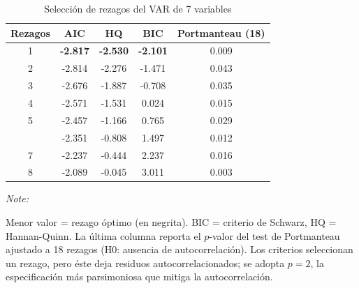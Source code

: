 \begin{table}[!h]
\centering
\caption{\label{tab:varselect7}Selección de rezagos del VAR de 7 variables}
\centering
\begin{threeparttable}
\begin{tabular}[t]{ccccc}
\toprule
Rezagos & AIC & HQ & BIC & Portmanteau (18)\\
\midrule
1 & \textbf{-2.817} & \textbf{-2.530} & \textbf{-2.101} & 0.009\\
2 & -2.814 & -2.276 & -1.471 & 0.043\\
3 & -2.676 & -1.887 & -0.708 & 0.035\\
4 & -2.571 & -1.531 & 0.024 & 0.015\\
5 & -2.457 & -1.166 & 0.765 & 0.029\\
\addlinespace
6 & -2.351 & -0.808 & 1.497 & 0.012\\
7 & -2.237 & -0.444 & 2.237 & 0.016\\
8 & -2.089 & -0.045 & 3.011 & 0.003\\
\bottomrule
\end{tabular}
\begin{tablenotes}
\item \textit{Note: } 
\item Menor valor = rezago óptimo (en negrita). BIC = criterio de Schwarz, HQ = Hannan-Quinn. La última columna reporta el $p$-valor del test de Portmanteau ajustado a 18 rezagos (H0: ausencia de autocorrelación). Los criterios seleccionan un rezago, pero éste deja residuos autocorrelacionados; se adopta $p=2$, la especificación más parsimoniosa que mitiga la autocorrelación.
\end{tablenotes}
\end{threeparttable}
\end{table}
